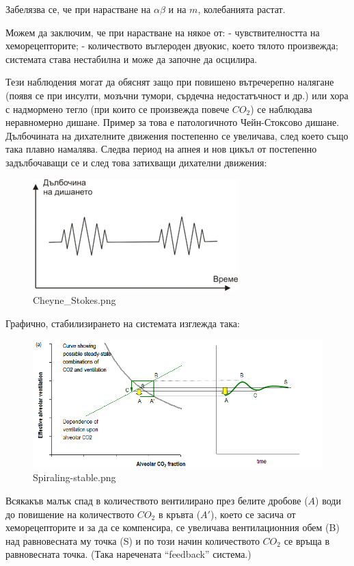 \documentclass[11pt]{article}
\makeatletter
\def\maxwidth{\ifdim\Gin@nat@width>\linewidth\linewidth
    \else\Gin@nat@width\fi}
\let\Oldincludegraphics\includegraphics
\renewcommand{\includegraphics}[1]{\Oldincludegraphics[width=.8\maxwidth]{#1}}
\makeatother
\begin{document}
    Забелязва се, че при нарастване на \(\alpha \beta\) и на \(m\),
колебанията растат.

Можем да заключим, че при нарастване на някое от: - чувствителността на
хеморецепторите; - количеството въглероден двуокис, което тялото
произвежда; системата става нестабилна и може да започне да осцилира.

Тези наблюдения могат да обяснят защо при повишено вътречерепно налягане
(появя се при инсулти, мозъчни тумори, сърдечна недостатъчност и др.)
или хора с надмормено тегло (при които се произвежда повече \(CO_2\)) се
наблюдава неравномерно дишане. Пример за това е патологичното
Чейн-Стоксово дишане. Дълбочината на дихателните движения постепенно се
увеличава, след което също така плавно намалява. Следва период на апнея
и нов цикъл от постепенно задълбочаващи се и след това затихващи
дихателни движения:

\begin{figure}
\centering
\includegraphics{img/Cheyne_Stokes.png}
\caption{Cheyne\_Stokes.png}
\end{figure}

    Графично, стабилизирането на системата изглежда така:

\begin{figure}
\centering
\includegraphics{img/Spiraling-stable.png}
\caption{Spiraling-stable.png}
\end{figure}

Всякакъв малък спад в количеството вентилирано през белите дробове
(\(A\)) води до повишение на количеството \(CO_2\) в кръвта (\(A'\)),
което се засича от хеморецепторите и за да се компенсира, се увеличава
вентилационния обем (B) над равновесната му точка (S) и по този начин
количеството \(CO_2\) се връща в равновесната точка. (Така наречената
``feedback'' система.)
\end{document}
